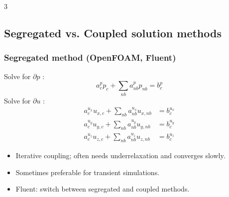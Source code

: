 \documentclass[landscape, a4paper]{article}
\begin{document}
\begin{multicols*}{3}
\begin{center}
\end{center}

\subsection{Segregated vs. Coupled solution methods}
\subsubsection{Segregated method (OpenFOAM, Fluent)}
Solve for $\partial p$ :
\[
  a_c^p p_c + \sum_{nb} a_{nb}^p p_{nb} = b_c^p
\]
Solve for $\partial u$ :
\[
\begin{aligned}
  a_c^{u_x}u_{x,c} + \sum_{nb}a_{nb}^{u_x}u_{x,nb} &= b_c^{u_x}\\
  a_c^{u_y}u_{y,c} + \sum_{nb}a_{nb}^{u_y}u_{y,nb} &= b_c^{u_y}\\
  a_c^{u_z}u_{z,c} + \sum_{nb}a_{nb}^{u_z}u_{z,nb} &= b_c^{u_z}
\end{aligned}
\]

\begin{itemize}
  \item Iterative coupling; often needs underrelaxation and converges slowly.
  \item Sometimes preferable for transient simulations.
  \item Fluent: switch between segregated and coupled methods.
\end{itemize}


\end{multicols*}
\end{document}
